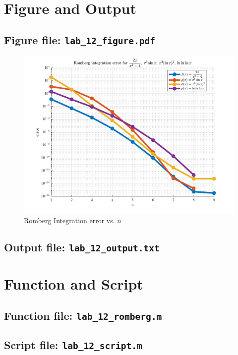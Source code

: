 \section{Figure and Output}
\subsection{Figure file: \lstinline[style=Plain]{lab_12_figure.pdf}}
\begin{figure}[!hbtp]
\centering
\includegraphics[width=\textwidth]{../src/lab_12_figure.pdf}
\caption{Romberg Integration error vs. $n$}
\end{figure}
\newpage
\subsection{Output file: \lstinline[style=Plain]{lab_12_output.txt}}

\newpage
\section{Function and Script}
\subsection{Function file:  \lstinline[style=Plain]{lab_12_romberg.m}}

\newpage
\subsection{Script file: \lstinline[style=Plain]{lab_12_script.m}}

